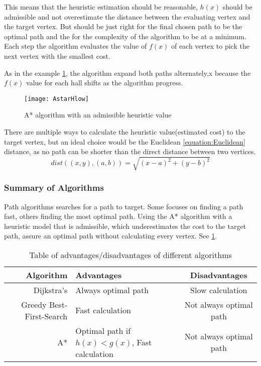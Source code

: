   This means that the heuristic estimation should be reasonable, $h(x)$ should be admissible and not overestimate the distance between the evaluating vertex and the target vertex. But should be just right for the final chosen path to be the optimal path and the for the complexity of the algorithm to be at a minimum. Each step the algorithm evaluates the value of $f(x)$ of each vertex to pick the next vertex with the smallest cost.

  As in the example \cref{astar}, the algorithm expand both paths alternately,x because the $f(x)$ value for each hall shifts as the algorithm progress. 

  \begin{figure}[ht!]
    \centering
    \texttt{[image: AstarHlow]}
    \caption{A* algorithm with an admissible heuristic value}
    \label{astar}
  \end{figure}

  There are multiple ways to calculate the heuristic value(estimated cost) to the target vertex, but an ideal choice would be the Euclidean \cref{equation:Euclidean} distance, as no path can be shorter than the direct distance between two vertices.
  \begin{equation} \label{equation:Euclidean}
    dist((x, y), (a, b)) = \sqrt{(x - a)^2 + (y - b)^2}
  \end{equation}

  \subsubsection{Summary of Algorithms}

  Path algorithms searches for a path to target. Some focuses on finding a path fast, others finding the most optimal path. Using the A* algorithm with a heuristic model that is admissible, which underestimates the cost to the target path, assure an optimal path without calculating every vertex. See \cref{tbl:scheme}.
  
  \begin{table}[ht!]
    \centering
    \begin{tabular}{|r|l|c|}

      \hline
      \textbf{Algorithm} & \textbf{Advantages} & \textbf{Disadvantages} \\
      \hline
      Dijkstra's & Always optimal path & Slow calculation \\
      Greedy Best-First-Search & Fast calculation & Not always optimal path \\
      A* & Optimal path if $h(x)<g(x)$, Fast calculation & Not always optimal path \\
      \hline
    \end{tabular}
    \caption{Table of advantages/disadvantages of different algorithms}
    \label{tbl:scheme}
  \end{table}